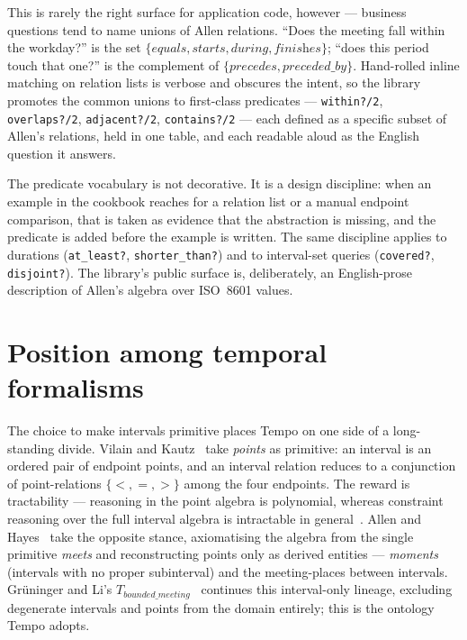 This is rarely the right surface for application code, however ---
business questions tend to name unions of Allen relations.
``Does the meeting fall within the workday?'' is the set
$\{\textit{equals}, \textit{starts}, \textit{during}, \textit{finishes}\}$;
``does this period touch that one?'' is the complement of
$\{\textit{precedes}, \textit{preceded\_by}\}$. Hand-rolled inline
matching on relation lists is verbose and obscures the intent, so the
library promotes the common unions to first-class predicates ---
\texttt{within?/2}, \texttt{overlaps?/2}, \texttt{adjacent?/2},
\texttt{contains?/2} --- each defined as a specific subset of Allen's
relations, held in one table, and each readable aloud as the English
question it answers.

The predicate vocabulary is not decorative. It is a design discipline:
when an example in the cookbook reaches for a relation list or a
manual endpoint comparison, that is taken as evidence that the
abstraction is missing, and the predicate is added before the example
is written. The same discipline applies to durations
(\texttt{at\_least?}, \texttt{shorter\_than?}) and to interval-set
queries (\texttt{covered?}, \texttt{disjoint?}). The library's
public surface is, deliberately, an English-prose description of
Allen's algebra over ISO~8601 values.

\section{Position among temporal formalisms}

The choice to make intervals primitive places Tempo on one side of a
long-standing divide. Vilain and Kautz~\cite{vilainkautz1986} take
\emph{points} as primitive: an interval is an ordered pair of endpoint
points, and an interval relation reduces to a conjunction of
point-relations $\{<,=,>\}$ among the four endpoints. The reward is
tractability --- reasoning in the point algebra is polynomial, whereas
constraint reasoning over the full interval algebra is intractable in
general~\cite{vilainkautz1986,nebel1995}. Allen and
Hayes~\cite{allenhayes1989} take the opposite stance, axiomatising the
algebra from the single primitive \textit{meets} and reconstructing
points only as derived entities --- \emph{moments} (intervals with no
proper subinterval) and the meeting-places between intervals.
Gr\"uninger and Li's $T_{bounded\_meeting}$~\cite{gruninger2017allenontology}
continues this interval-only lineage, excluding degenerate intervals
and points from the domain entirely; this is the ontology Tempo
adopts.

